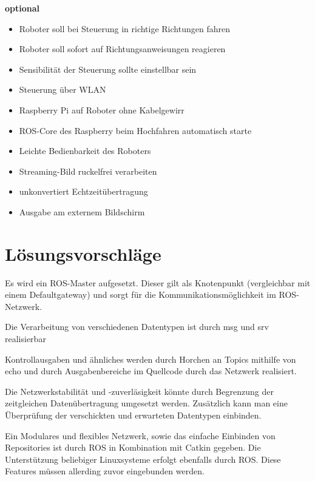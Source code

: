 \documentclass[12pt]{article}
\begin{document}
{\bf optional}

\begin{itemize}
\item Roboter soll bei Steuerung in richtige Richtungen fahren
\item Roboter soll sofort auf Richtungsanweisungen reagieren
\item Sensibilität der Steuerung sollte einstellbar sein
\item Steuerung über WLAN
\item Raspberry Pi auf Roboter ohne Kabelgewirr %
\item ROS-Core des Raspberry beim Hochfahren automatisch starte
\item Leichte Bedienbarkeit des Roboters

\vspace{0,6cm}

\item Streaming-Bild ruckelfrei verarbeiten
\item unkonvertiert Echtzeitübertragung
\item Ausgabe am externem Bildschirm
\end{itemize}


\section{Lösungsvorschläge}


Es wird ein ROS-Master aufgesetzt. Dieser gilt als Knotenpunkt (vergleichbar mit einem Defaultgateway) und sorgt für die Kommunikationsmöglichkeit im ROS-Netzwerk.

Die Verarbeitung von verschiedenen Datentypen ist durch msg und srv realisierbar

Kontrollausgaben und ähnliches werden durch Horchen an Topics mithilfe von echo und durch Ausgabenbereiche im Quellcode durch das Netzwerk realisiert.
 

Die Netzwerkstabilität und -zuverläsigkeit könnte durch Begrenzung der zeitgleichen Datenübertragung umgesetzt werden. Zusätzlich kann man eine Überprüfung der verschickten und erwarteten Datentypen einbinden.


Ein Modulares und flexibles Netzwerk, sowie das einfache Einbinden von Repositories ist durch ROS in Kombination mit Catkin gegeben. Die Unterstützung beliebiger Linuxsysteme erfolgt ebenfalls durch ROS. Diese Features müssen allerding zuvor eingebunden werden.
\end{document}
